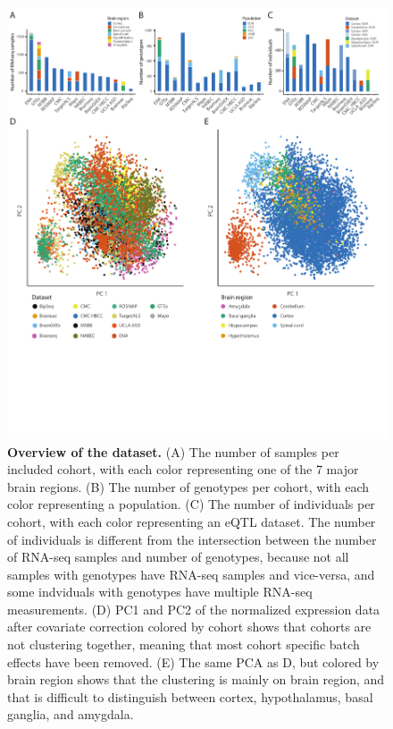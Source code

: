 {{\begin{figure}[H]
	\includegraphics[width=\textwidth]{chapters/chapter5-brain-eqtls/img/2020-07-09-fig2-datasetoverview-v5.pdf}
	\caption{\textbf{Overview of the dataset.} (A) The number of samples per included cohort, with each color representing one of the 7 major brain regions. (B) The number of genotypes per cohort, with each color representing a population. (C) The number of individuals per cohort, with each color representing an eQTL dataset. The number of individuals is different from the intersection between the number of RNA-seq samples and number of genotypes, because not all samples with genotypes have RNA-seq samples and vice-versa, and some indviduals with genotypes have multiple RNA-seq measurements. (D) PC1 and PC2 of the normalized expression data after covariate correction colored by cohort shows that cohorts are not clustering together, meaning that most cohort specific batch effects have been removed. (E) The same PCA as D, but colored by brain region shows that the clustering is mainly on brain region, and that is difficult to distinguish between cortex, hypothalamus, basal ganglia, and amygdala.}
\end{figure}

}}
